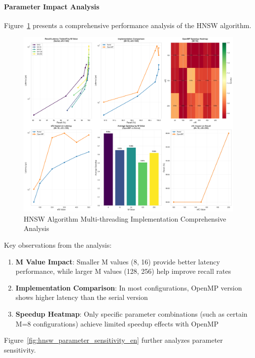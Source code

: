 \paragraph{Parameter Impact Analysis}

Figure~\ref{fig:hnsw_comprehensive_en} presents a comprehensive performance analysis of the HNSW algorithm.

\begin{figure}[htbp]
\centering
\includegraphics[width=\textwidth]{plots/hnsw_comprehensive_analysis_en.png}
\caption{HNSW Algorithm Multi-threading Implementation Comprehensive Analysis}
\label{fig:hnsw_comprehensive_en}
\end{figure}

Key observations from the analysis:
\begin{enumerate}
    \item \textbf{M Value Impact}: Smaller M values (8, 16) provide better latency performance, while larger M values (128, 256) help improve recall rates
    \item \textbf{Implementation Comparison}: In most configurations, OpenMP version shows higher latency than the serial version
    \item \textbf{Speedup Heatmap}: Only specific parameter combinations (such as certain M=8 configurations) achieve limited speedup effects with OpenMP
\end{enumerate}

Figure~\ref{fig:hnsw_parameter_sensitivity_en} further analyzes parameter sensitivity.

